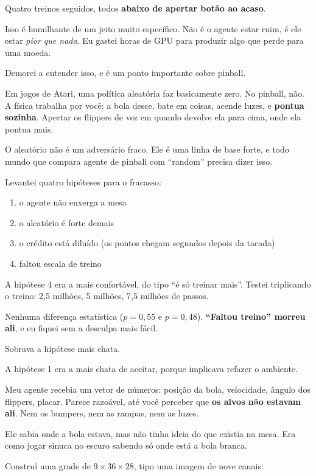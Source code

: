 \documentclass[10pt,a4paper,twoside,twocolumn]{scrartcl}
\providecommand{\tightlist}{%
  \setlength{\itemsep}{0pt}\setlength{\parskip}{0pt}}
\begin{document}
Quatro treinos seguidos, todos \textbf{abaixo de apertar botão ao
acaso}.

Isso é humilhante de um jeito muito específico. Não é o agente estar
ruim, é ele estar \emph{pior que nada}. Eu gastei horas de GPU para
produzir algo que perde para uma moeda.

Demorei a entender isso, e é um ponto importante sobre pinball.

Em jogos de Atari, uma política aleatória faz basicamente zero. No
pinball, não. A física trabalha por você: a bola desce, bate em coisas,
acende luzes, e \textbf{pontua sozinha}. Apertar os flippers de vez em
quando devolve ela para cima, onde ela pontua mais.

O aleatório não é um adversário fraco. Ele é uma linha de base forte, e
todo mundo que compara agente de pinball com ``random'' precisa dizer
isso.

Levantei quatro hipóteses para o fracasso:

\begin{enumerate}
\def\labelenumi{\arabic{enumi}.}
\tightlist
\item
  o agente não enxerga a mesa
\item
  o aleatório é forte demais
\item
  o crédito está diluído (os pontos chegam segundos depois da tacada)
\item
  faltou escala de treino
\end{enumerate}

A hipótese 4 era a mais confortável, do tipo ``é só treinar mais''.
Testei triplicando o treino: 2,5 milhões, 5 milhões, 7,5 milhões de
passos.

Nenhuma diferença estatística (\(p = 0{,}55\) e \(p = 0{,}48\)).
\textbf{``Faltou treino'' morreu ali}, e eu fiquei sem a desculpa mais
fácil.

Sobrava a hipótese mais chata.

A hipótese 1 era a mais chata de aceitar, porque implicava refazer o
ambiente.

Meu agente recebia um vetor de números: posição da bola, velocidade,
ângulo dos flippers, placar. Parece razoável, até você perceber que
\textbf{os alvos não estavam ali}. Nem os bumpers, nem as rampas, nem as
luzes.

Ele sabia onde a bola estava, mas não tinha ideia do que existia na
mesa. Era como jogar sinuca no escuro sabendo só onde está a bola
branca.

Construí uma grade de \(9 \times 36 \times 28\), tipo uma imagem de nove
canais:
\end{document}
